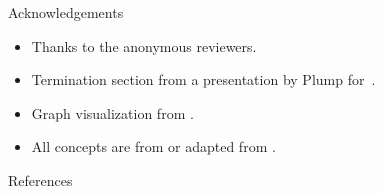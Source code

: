 \documentclass{beamer}
\begin{document}
\begin{frame}{Acknowledgements}
  \begin{itemize}
    \item Thanks to the anonymous reviewers.
    \item Termination section from a presentation by Plump for~\cite{plump2018modular}.
    \item Graph visualization from \cite{overbeek2023apbpotutorial}.
    \item All concepts are from or adapted from \cite{endrullis2024generalized_arxiv_v2}.
  \end{itemize}
\end{frame}

\begin{frame}[allowframebreaks]{References}
    \printbibliography[heading=none]
\end{frame}
\end{document}
